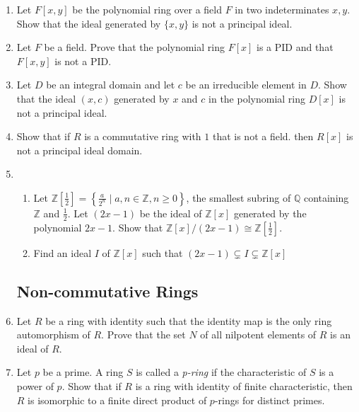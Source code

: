 \documentclass{article}
\theoremstyle{definition}
\newcommand{\Z}{\mathbb{Z}}
\newcommand{\Q}{\mathbb{Q}}
\newcommand{\set}[1]{\left\{#1\right\}}
\begin{document}
\begin{enumerate}
            \item Let $F[x,y]$ be the polynomial ring over a field $F$ in two indeterminates $x,y$. Show that the ideal generated by $\{x,y\}$ is not a principal ideal.
            
            \item Let $F$ be a field. Prove that the polynomial ring $F[x]$ is a PID and that $F[x,y]$ is not a PID.
            
            \item Let $D$ be an integral domain and let $c$ be an irreducible element in $D$. Show that the ideal $(x,c)$ generated by $x$ and $c$ in the polynomial ring $D[x]$ is not a principal ideal.
            
            \item Show that if $R$ is a commutative ring with $1$ that is not a field. then $R[x]$ is not a principal ideal domain.
            
            \item
            
            \begin{enumerate}
                \item Let $\Z[\frac{1}{2}]=\set{\frac{a}{2^n} \mid a,n\in \Z, n\geq 0}$, the smallest subring of $\Q$ containing $\Z$ and $\frac{1}{2}$. Let $(2x-1)$ be the ideal of $\Z[x]$ generated by the polynomial $2x-1$. Show that $\Z[x]/(2x-1) \cong \Z[\frac{1}{2}]$.
                \item Find an ideal $I$ of $\Z[x]$ such that $(2x-1)\subsetneq I \subsetneq \Z[x]$
            \end{enumerate}

        \subsection{Non-commutative Rings}

            \item Let $R$ be a ring with identity such that the identity map is the only ring automorphism of $R$. Prove that the set $N$ of all nilpotent elements of $R$ is an ideal of $R$.
            
            \item Let $p$ be a prime. A ring $S$ is called a \textit{p-ring} if the characteristic of $S$ is a power of $p$. Show that if $R$ is a ring with identity of finite characteristic, then $R$ is isomorphic to a finite direct product of $p$-rings for distinct primes.
            

\end{enumerate}
\end{document}
